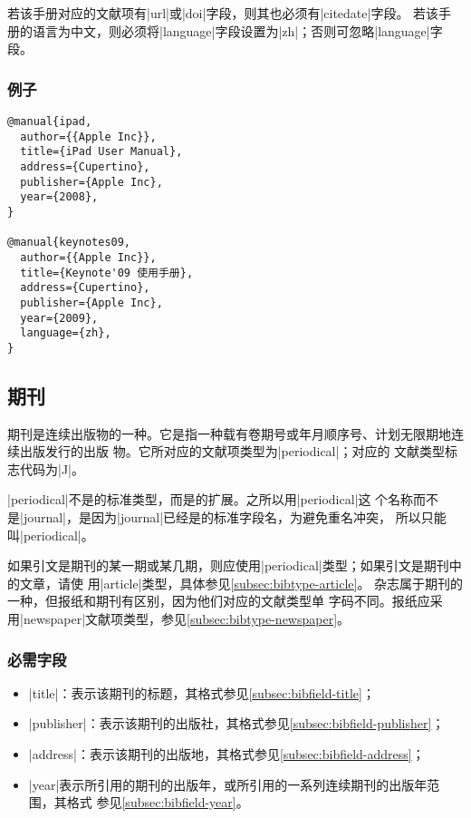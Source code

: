 \begin{note}
若该手册对应的文献项有|url|或|doi|字段，则其也必须有|citedate|字段。
若该手册的语言为中文，则必须将|language|字段设置为|zh|；否则可忽略|language|字段。
\end{note}

\subsubsection{例子}

\begin{verbatim}
@manual{ipad,
  author={{Apple Inc}},
  title={iPad User Manual},
  address={Cupertino},
  publisher={Apple Inc},
  year={2008},
}

@manual{keynotes09,
  author={{Apple Inc}},
  title={Keynote'09 使用手册},
  address={Cupertino},
  publisher={Apple Inc},
  year={2009},
  language={zh},
}
\end{verbatim}


\subsection{期刊}\label{subsec:bibtype-periodical}

期刊是连续出版物的一种。它是指一种载有卷期号或年月顺序号、计划无限期地连续出版发行的出版
物\cite{gbt7714-2005}。它所对应的{\BibTeX}文献项类型为|periodical|；对应的
文献类型标志代码为|J|\cite{gbt3469-1983}。

|periodical|不是{\BibTeX}的标准类型，而是{\njuthesis}的扩展。之所以用|periodical|这
个名称而不是|journal|，是因为|journal|已经是{\BibTeX}的标准字段名，为避免重名冲突，
所以只能叫|periodical|。

\begin{note}
如果引文是期刊的某一期或某几期，则应使用|periodical|类型；如果引文是期刊中的文章，请使
用|article|类型，具体参见\ref{subsec:bibtype-article}。
杂志属于期刊的一种，但报纸和期刊有区别，因为他们对应的文献类型单
字码不同。报纸应采用|newspaper|文献项类型，参见\ref{subsec:bibtype-newspaper}。
\end{note}

\subsubsection{必需字段}

\begin{itemize}
\item |title|：表示该期刊的标题，其格式参见\ref{subsec:bibfield-title}；
\item |publisher|：表示该期刊的出版社，其格式参见\ref{subsec:bibfield-publisher}；
\item |address|：表示该期刊的出版地，其格式参见\ref{subsec:bibfield-address}；
\item |year|表示所引用的期刊的出版年，或所引用的一系列连续期刊的出版年范围，其格式
  参见\ref{subsec:bibfield-year}。
\end{itemize}

